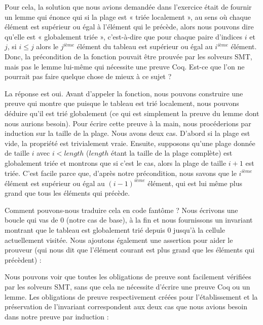 

Pour cela, la solution que nous avions demandée dans l'exercice était de fournir
un lemme qui énonce qui si la plage est « triée localement », au sens où chaque
élément est supérieur ou égal à l'élément qui le précède, alors nous pouvons
dire qu'elle est « globalement triée », c'est-à-dire que pour chaque paire
d'indices $i$ et $j$, si $i \leq j$ alors le $j^{ième}$ élément du tableau est
supérieur ou égal au $i^{ième}$ élément. Donc, la précondition de la fonction
pouvait être prouvée par les solveurs SMT, mais pas le lemme lui-même qui
nécessite une preuve Coq. Est-ce que l'on ne pourrait pas faire quelque chose
de mieux à ce sujet ?


La réponse est oui. Avant d'appeler la fonction, nous pouvons construire une
preuve qui montre que puisque le tableau est trié localement, nous pouvons
déduire qu'il est trié globalement (ce qui est simplement la preuve du lemme
dont nous aurions besoin). Pour écrire cette preuve à la main, nous procéderions
par induction sur la taille de la plage. Nous avons deux cas. D'abord si la
plage est vide, la propriété est trivialement vraie. Ensuite, supposons qu'une 
plage donnée de taille $i$ avec $i < length$ ($length$ étant la taille de la 
plage complète) est globalement triée et montrons que si c'est le cas, alors la
plage de taille $i+1$ est triée. C'est facile parce que, d'après notre
précondition, nous savons que le $i^{ième}$ élément est supérieur ou égal au
$(i-1)^{ième}$ élément, qui est lui même plus grand que tous les éléments qui
précède.


Comment pouvons-nous traduire cela en code fantôme ? Nous écrivons une boucle qui
vas de $0$ (notre cas de base), à la fin  et nous fournissons
un invariant montrant que le tableau est globalement trié depuis $0$ jusqu'à la
cellule actuellement visitée. Nous ajoutons également une assertion pour aider le
prouveur (qui nous dit que l'élément courant est plus grand que les éléments qui
précèdent) :






Nous pouvons voir que toutes les obligations de preuve sont facilement
vérifiées par les solveurs SMT, sans que cela ne nécessite d'écrire une preuve Coq
ou un lemme. Les obligations de preuve respectivement créées pour
l'établissement et la préservation de l'invariant correspondent aux deux cas que
nous avions besoin dans notre preuve par induction :


